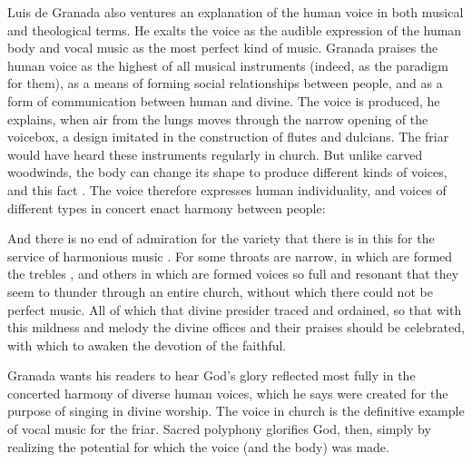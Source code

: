 Luis de Granada also ventures an explanation of the human voice in both
musical and theological terms.
He exalts the voice as the audible expression of the human body and
vocal music as the most perfect kind of music.%
    \Autocite[243]{LuisdeGranada:Simbolo} 
Granada praises the human voice as the highest of all musical instruments
(indeed, as the paradigm for them), as a means of forming social relationships
between people, and as a form of communication between human and divine.
The voice is produced, he explains, when air from the lungs moves through the
narrow opening of the voicebox, a design imitated in the construction of flutes
and dulcians.
The friar would have heard these instruments regularly in church.
But unlike carved woodwinds, the body can change its shape to produce
different kinds of voices, and this fact .%
    \Autocite[252]{LuisdeGranada:Simbolo}
The voice therefore expresses human individuality, and voices of different
types in concert enact harmony between people: 
\begin{quoting} 
    And there is no end of admiration for the variety that there is in this for
    the service of harmonious music .  
    For some throats are narrow, in which are formed the trebles
    , and others in which are formed voices so full and
    resonant that they seem to thunder through an entire church, without which
    there could not be perfect music.
    All of which that divine presider traced and ordained, so that with this
    mildness and melody the divine offices and their praises should be
    celebrated, with which to awaken the devotion of the faithful.%
        \Autocite[252]{LuisdeGranada:Simbolo} 
\end{quoting}
Granada wants his readers to hear God's glory reflected most fully in the
concerted harmony of diverse human voices, which he says were created for the
purpose of singing in divine worship.
The voice in church is the definitive example of vocal music for the friar.
Sacred polyphony glorifies God, then, simply by realizing the potential for
which the voice (and the body) was made.

